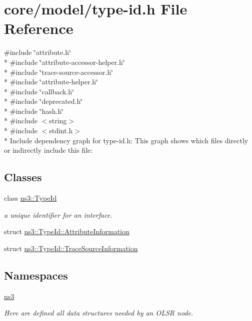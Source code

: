 \hypertarget{type-id_8h}{}\section{core/model/type-\/id.h File Reference}
\label{type-id_8h}
{\ttfamily \#include \char`\"{}attribute.\+h\char`\"{}}\\*
{\ttfamily \#include \char`\"{}attribute-\/accessor-\/helper.\+h\char`\"{}}\\*
{\ttfamily \#include \char`\"{}trace-\/source-\/accessor.\+h\char`\"{}}\\*
{\ttfamily \#include \char`\"{}attribute-\/helper.\+h\char`\"{}}\\*
{\ttfamily \#include \char`\"{}callback.\+h\char`\"{}}\\*
{\ttfamily \#include \char`\"{}deprecated.\+h\char`\"{}}\\*
{\ttfamily \#include \char`\"{}hash.\+h\char`\"{}}\\*
{\ttfamily \#include $<$string$>$}\\*
{\ttfamily \#include $<$stdint.\+h$>$}\\*
Include dependency graph for type-\/id.h\+:
This graph shows which files directly or indirectly include this file\+:
\subsection*{Classes}
\begin{DoxyCompactItemize}
\item 
class \hyperlink{classns3_1_1TypeId}{ns3\+::\+Type\+Id}
\begin{DoxyCompactList}\small\item\em a unique identifier for an interface. \end{DoxyCompactList}\item 
struct \hyperlink{structns3_1_1TypeId_1_1AttributeInformation}{ns3\+::\+Type\+Id\+::\+Attribute\+Information}
\item 
struct \hyperlink{structns3_1_1TypeId_1_1TraceSourceInformation}{ns3\+::\+Type\+Id\+::\+Trace\+Source\+Information}
\end{DoxyCompactItemize}
\subsection*{Namespaces}
\begin{DoxyCompactItemize}
\item 
 \hyperlink{namespacens3}{ns3}
\begin{DoxyCompactList}\small\item\em Here are defined all data structures needed by an O\+L\+SR node. \end{DoxyCompactList}\end{DoxyCompactItemize}
